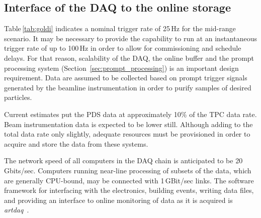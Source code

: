 \subsection{Interface of the DAQ to the online storage}
\label{sec:DAQ_online_interface}

Table\,\ref{tab:goldi} indicates a nominal trigger rate of 25\,Hz for
the mid-range scenario. It may be necessary to provide the capability
to run at  an instantaneous trigger rate of up to 100\,Hz in order to
allow for commissioning and schedule delays. For that reason,
scalability of the DAQ, the online buffer and the prompt processing system
(Section~\ref{sec:prompt_processing}) is an important design requirement.
 Data are assumed to be
collected based on prompt trigger signals generated by the beamline
instrumentation in order to purify samples of desired particles.

Current estimates put the PDS data at approximately 10\% 
of the TPC data rate.  Beam instrumentation data is expected to be lower still.
Although adding to the
total data rate only slightly, adequate resources must
be provisioned in order to acquire and store the data from these
systems.  

The network speed of all computers in the DAQ
chain is anticipated to be 20\,Gbits/sec. 
 Computers running near-line
processing of subsets of the data, which are generally CPU-bound, may
be connected with 1\,GBit/sec links.  The software framework for
interfacing with the electronics, building events, writing data files,
and providing an interface to online monitoring of data as it is
acquired is {\it artdaq}~\cite{artdaq}.

